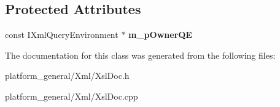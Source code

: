 \subsection*{\-Protected \-Attributes}
\begin{DoxyCompactItemize}
\item 
\hypertarget{classgeneral__server_1_1XslTransformContext_a6835293f5384d5f669fe6965e35fc395}{const \-I\-Xml\-Query\-Environment $\ast$ {\bfseries m\-\_\-p\-Owner\-Q\-E}}\label{classgeneral__server_1_1XslTransformContext_a6835293f5384d5f669fe6965e35fc395}

\end{DoxyCompactItemize}


\-The documentation for this class was generated from the following files\-:\begin{DoxyCompactItemize}
\item 
platform\-\_\-general/\-Xml/\-Xsl\-Doc.\-h\item 
platform\-\_\-general/\-Xml/\-Xsl\-Doc.\-cpp\end{DoxyCompactItemize}
